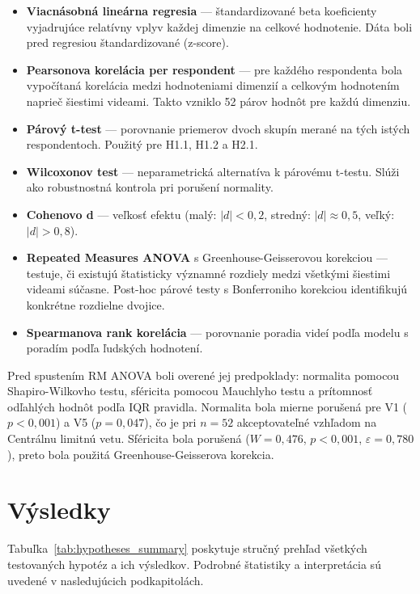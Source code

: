 \begin{itemize}
    \item \textbf{Viacnásobná lineárna regresia} --- štandardizované beta koeficienty vyjadrujúce relatívny vplyv každej dimenzie na celkové hodnotenie. Dáta boli pred regresiou štandardizované (z-score).
    \item \textbf{Pearsonova korelácia per respondent} --- pre každého respondenta bola vypočítaná korelácia medzi hodnoteniami dimenzií a celkovým hodnotením naprieč šiestimi videami. Takto vzniklo 52 párov hodnôt pre každú dimenziu.
    \item \textbf{Párový t-test} --- porovnanie priemerov dvoch skupín merané na tých istých respondentoch. Použitý pre H1.1, H1.2 a H2.1.
    \item \textbf{Wilcoxonov test} --- neparametrická alternatíva k párovému t-testu. Slúži ako robustnostná kontrola pri porušení normality.
    \item \textbf{Cohenovo d} --- veľkosť efektu (malý: $|d| < 0{,}2$, stredný: $|d| \approx 0{,}5$, veľký: $|d| > 0{,}8$).
    \item \textbf{Repeated Measures ANOVA} s Greenhouse-Geisserovou korekciou --- testuje, či existujú štatisticky významné rozdiely medzi všetkými šiestimi videami súčasne. Post-hoc párové testy s Bonferroniho korekciou identifikujú konkrétne rozdielne dvojice.
    \item \textbf{Spearmanova rank korelácia} --- porovnanie poradia videí podľa modelu s poradím podľa ľudských hodnotení.
\end{itemize}

Pred spustením RM ANOVA boli overené jej predpoklady: normalita pomocou Shapiro-Wilkovho testu, sféricita pomocou Mauchlyho testu a prítomnosť odľahlých hodnôt podľa IQR pravidla. Normalita bola mierne porušená pre V1 ($p < 0{,}001$) a V5 ($p = 0{,}047$), čo je pri $n = 52$ akceptovateľné vzhľadom na Centrálnu limitnú vetu. Sféricita bola porušená ($W = 0{,}476$, $p < 0{,}001$, $\varepsilon = 0{,}780$), preto bola použitá Greenhouse-Geisserova korekcia.

\section{Výsledky}

Tabuľka~\ref{tab:hypotheses_summary} poskytuje stručný prehľad všetkých testovaných hypotéz a ich výsledkov. Podrobné štatistiky a interpretácia sú uvedené v nasledujúcich podkapitolách.

